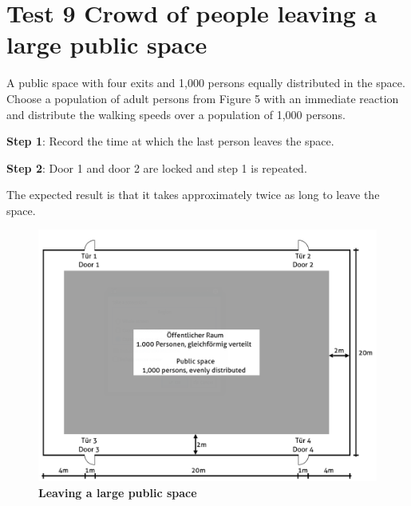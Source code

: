 \section*{Test 9 Crowd of people leaving a large public space}

A public space with four exits and 1,000 persons equally distributed in the space. Choose a population of adult persons from Figure 5 with an immediate reaction and distribute the walking speeds over a population of 1,000 persons.
\vspace{4mm}

\noindent
\textbf{Step 1}: Record the time at which the last person leaves the space.

\vspace{4mm}

\noindent
\textbf{Step 2}: Door 1 and door 2 are locked and step 1 is repeated.

\vspace{4mm}

\noindent
The expected result is that it takes approximately twice as long to leave the space.



\begin{figure}[h]
	\centering
	\includegraphics[scale=0.5]{test_description/Large_public_space_test_9.png}
	\caption{\footnotesize \textbf{Leaving a large public space}}
\end{figure}

